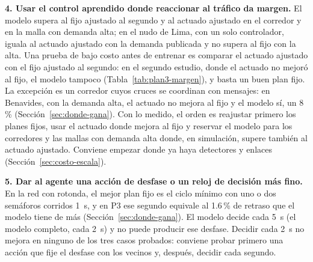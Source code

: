 \noindent\textbf{4. Usar el control aprendido donde reaccionar al
tráfico da margen.} El modelo supera al fijo ajustado al segundo y al
actuado ajustado en el corredor y en la malla con demanda alta; en el
nudo de Lima, con un solo controlador, iguala al actuado ajustado con la
demanda publicada y no supera al fijo con la alta. Una prueba de bajo
costo antes de entrenar es comparar el actuado ajustado con el fijo
ajustado al segundo: en el segundo estudio, donde el actuado no mejoró
al fijo, el modelo tampoco (Tabla~\ref{tab:plan3-margen}), y basta un
buen plan fijo. La excepción es un corredor cuyos cruces se coordinan
con mensajes: en Benavides, con la demanda alta, el actuado no mejora
al fijo y el modelo sí, un 8\,\% (Sección~\ref{sec:donde-gana}). Con
lo medido, el orden es reajustar primero los planes fijos, usar el
actuado donde mejora al fijo y reservar el modelo para los corredores y
las mallas con demanda alta donde, en simulación, supere también al
actuado ajustado. Conviene empezar donde ya haya detectores y enlaces
(Sección~\ref{sec:costo-escala}).

\noindent\textbf{5. Dar al agente una acción de desfase o un reloj de
decisión más fino.} En la red con rotonda, el mejor plan fijo es el
ciclo mínimo con uno o dos semáforos corridos 1~s, y en P3 ese segundo
equivale al 1.6\,\% de retraso que el modelo tiene de más
(Sección~\ref{sec:donde-gana}). El modelo decide cada 5~s (el modelo
completo, cada 2~s) y no puede producir ese desfase. Decidir cada 2~s no
mejora en ninguno de los tres casos probados: conviene probar primero
una acción que fije el desfase con los vecinos y, después, decidir cada
segundo.

